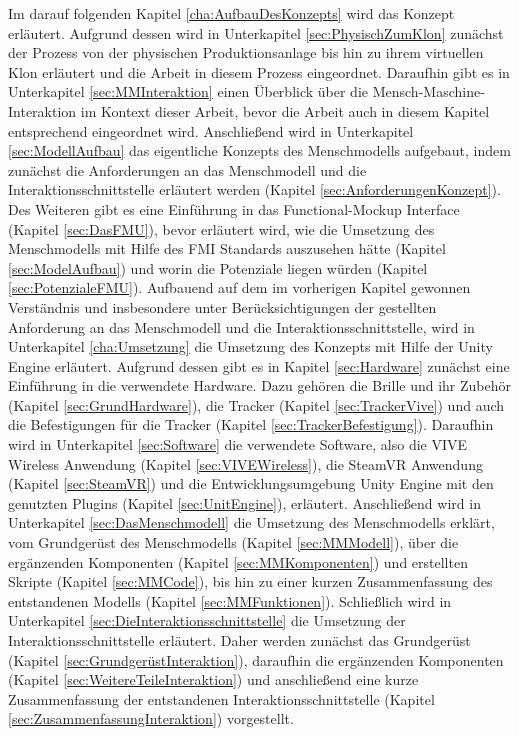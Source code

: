 \newline
Im darauf folgenden Kapitel \ref{cha:AufbauDesKonzepts} wird das Konzept erläutert. Aufgrund dessen wird in Unterkapitel \ref{sec:PhysischZumKlon} zunächst der Prozess von der physischen Produktionsanlage bis hin zu ihrem virtuellen Klon erläutert und die Arbeit in diesem Prozess eingeordnet. Daraufhin gibt es in Unterkapitel \ref{sec:MMInteraktion} einen Überblick über die Mensch-Maschine-Interaktion im Kontext dieser Arbeit, bevor die Arbeit auch in diesem Kapitel entsprechend eingeordnet wird. Anschließend wird in Unterkapitel \ref{sec:ModellAufbau} das eigentliche Konzepts des Menschmodells aufgebaut, indem zunächst die Anforderungen an das Menschmodell und die Interaktionsschnittstelle erläutert werden (Kapitel \ref{sec:AnforderungenKonzept}). Des Weiteren gibt es eine Einführung in das Functional-Mockup Interface (Kapitel \ref{sec:DasFMU}), bevor erläutert wird, wie die Umsetzung des Menschmodells mit Hilfe des FMI Standards auszusehen hätte (Kapitel \ref{sec:ModelAufbau}) und worin die Potenziale liegen würden (Kapitel \ref{sec:PotenzialeFMU}).
\newline
Aufbauend auf dem im vorherigen Kapitel gewonnen Verständnis und insbesondere unter Berücksichtigungen der gestellten Anforderung an das Menschmodell und die Interaktionsschnittstelle, wird in Unterkapitel \ref{cha:Umsetzung} die Umsetzung des Konzepts mit Hilfe der Unity Engine erläutert. Aufgrund dessen gibt es in Kapitel \ref{sec:Hardware} zunächst eine Einführung in die verwendete Hardware. Dazu gehören die Brille und ihr Zubehör (Kapitel \ref{sec:GrundHardware}), die Tracker (Kapitel \ref{sec:TrackerVive}) und auch die Befestigungen für die Tracker (Kapitel \ref{sec:TrackerBefestigung}). Daraufhin wird in Unterkapitel \ref{sec:Software} die verwendete Software, also die VIVE Wireless Anwendung (Kapitel \ref{sec:VIVEWireless}), die SteamVR Anwendung (Kapitel \ref{sec:SteamVR}) und die Entwicklungsumgebung Unity Engine mit den genutzten Plugins (Kapitel \ref{sec:UnitEngine}), erläutert. Anschließend wird in Unterkapitel \ref{sec:DasMenschmodell} die Umsetzung des Menschmodells erklärt, vom Grundgerüst des Menschmodells (Kapitel \ref{sec:MMModell}), über die ergänzenden Komponenten (Kapitel \ref{sec:MMKomponenten}) und erstellten Skripte (Kapitel \ref{sec:MMCode}), bis hin zu einer kurzen Zusammenfassung des entstandenen Modells (Kapitel \ref{sec:MMFunktionen}). Schließlich wird in Unterkapitel \ref{sec:DieInteraktionsschnittstelle} die Umsetzung der Interaktionsschnittstelle erläutert. Daher werden zunächst das Grundgerüst (Kapitel \ref{sec:GrundgerüstInteraktion}), daraufhin die ergänzenden Komponenten (Kapitel \ref{sec:WeitereTeileInteraktion}) und anschließend eine kurze Zusammenfassung der entstandenen Interaktionsschnittstelle (Kapitel \ref{sec:ZusammenfassungInteraktion}) vorgestellt.
